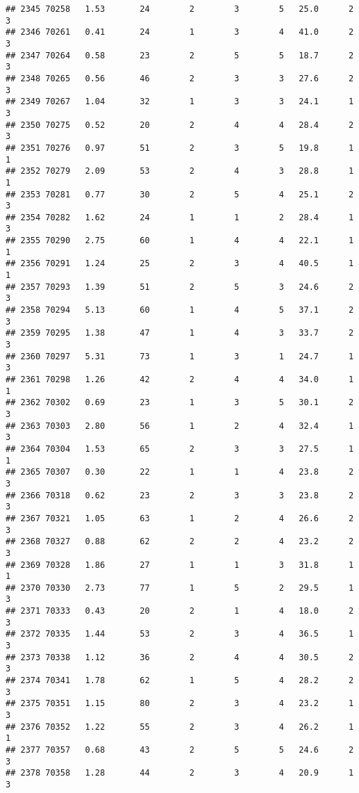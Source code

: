 \documentclass[
]{article}
\begin{document}
\begin{verbatim}
## 2345 70258   1.53       24        2        3        5   25.0      2      3
## 2346 70261   0.41       24        1        3        4   41.0      2      3
## 2347 70264   0.58       23        2        5        5   18.7      2      3
## 2348 70265   0.56       46        2        3        3   27.6      2      3
## 2349 70267   1.04       32        1        3        3   24.1      1      3
## 2350 70275   0.52       20        2        4        4   28.4      2      3
## 2351 70276   0.97       51        2        3        5   19.8      1      1
## 2352 70279   2.09       53        2        4        3   28.8      1      1
## 2353 70281   0.77       30        2        5        4   25.1      2      3
## 2354 70282   1.62       24        1        1        2   28.4      1      3
## 2355 70290   2.75       60        1        4        4   22.1      1      1
## 2356 70291   1.24       25        2        3        4   40.5      1      1
## 2357 70293   1.39       51        2        5        3   24.6      2      3
## 2358 70294   5.13       60        1        4        5   37.1      2      3
## 2359 70295   1.38       47        1        4        3   33.7      2      3
## 2360 70297   5.31       73        1        3        1   24.7      1      3
## 2361 70298   1.26       42        2        4        4   34.0      1      1
## 2362 70302   0.69       23        1        3        5   30.1      2      3
## 2363 70303   2.80       56        1        2        4   32.4      1      3
## 2364 70304   1.53       65        2        3        3   27.5      1      1
## 2365 70307   0.30       22        1        1        4   23.8      2      3
## 2366 70318   0.62       23        2        3        3   23.8      2      3
## 2367 70321   1.05       63        1        2        4   26.6      2      3
## 2368 70327   0.88       62        2        2        4   23.2      2      3
## 2369 70328   1.86       27        1        1        3   31.8      1      1
## 2370 70330   2.73       77        1        5        2   29.5      1      3
## 2371 70333   0.43       20        2        1        4   18.0      2      3
## 2372 70335   1.44       53        2        3        4   36.5      1      3
## 2373 70338   1.12       36        2        4        4   30.5      2      3
## 2374 70341   1.78       62        1        5        4   28.2      2      3
## 2375 70351   1.15       80        2        3        4   23.2      1      3
## 2376 70352   1.22       55        2        3        4   26.2      1      1
## 2377 70357   0.68       43        2        5        5   24.6      2      3
## 2378 70358   1.28       44        2        3        4   20.9      1      3

\end{verbatim}
\end{document}
